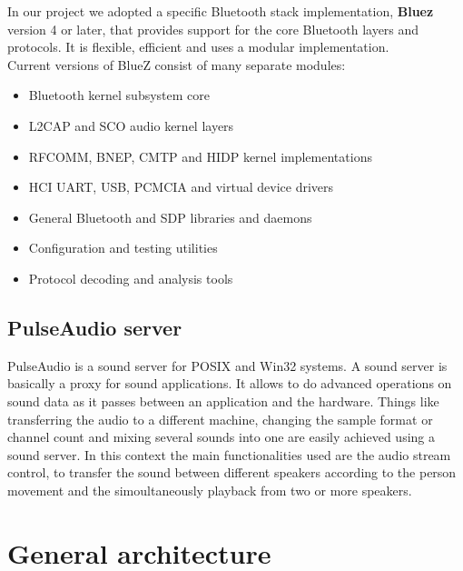 \documentclass[conference]{IEEEtran}
\begin{document}
In our project we adopted a specific Bluetooth stack implementation, \textbf{Bluez} version 4 or later, that provides support for the core Bluetooth layers and protocols. It is flexible, efficient and uses a modular implementation. \\

Current versions of BlueZ consist of many separate modules:
\begin{itemize}
\item Bluetooth kernel subsystem core
\item L2CAP and SCO audio kernel layers
\item RFCOMM, BNEP, CMTP and HIDP kernel implementations
\item HCI UART, USB, PCMCIA and virtual device drivers
\item General Bluetooth and SDP libraries and daemons
\item Configuration and testing utilities
\item Protocol decoding and analysis tools
\end{itemize}

\subsection{PulseAudio server}
PulseAudio is a sound server for POSIX and Win32 systems. A sound server is basically a proxy for sound applications. It allows to do advanced operations on sound data as it passes between an application and the hardware. Things like transferring the audio to a different machine, changing the sample format or channel count and mixing several sounds into one are easily achieved using a sound server. In this context the main functionalities used are the audio stream control, to transfer the sound between different speakers according to the person movement and the simoultaneously playback from two or more speakers.

\section{General architecture}
\end{document}
